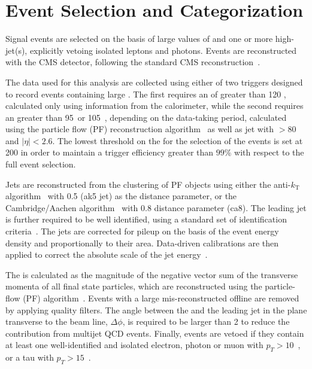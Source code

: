 \section{Event Selection and Categorization}\label{sec:selection}

Signal events are selected on the basis of large values of \ETm and one or more high-\pt jet(s), 
explicitly vetoing isolated leptons and photons. Events are
reconstructed with the CMS detector, following the standard CMS reconstruction~\cite{CMSdetector}. 

The data used for this analysis are collected using either of two triggers designed to record events containing large \ETm. The first requires an \ETm of greater than 120 \gev, calculated only using information from the calorimeter, 
while the second requires an \ETm greater than 95~\gev or 105~\gev, depending on the data-taking period, calculated using  
the particle flow (PF) reconstruction algorithm~\cite{CMS-PAS-PFT-09-001} as well as jet with \pt$>80$ \gev and $|\eta|<2.6$. 
The lowest threshold on the \ETm for the selection of the events is set at 200 \gev in order to maintain a trigger efficiency greater than 
$99$\% with respect to the full event selection. 

Jets are reconstructed from the clustering of PF objects using either the 
anti-$k_{\textrm{T}}$ algorithm~\cite{Cacciari:2008gp} with 0.5 (ak5 jet) as the distance parameter,  
or the Cambridge/Aachen algorithm~\cite{cajets} with 0.8 distance
parameter (ca8). The leading jet is further required to be well
identified, using a standard set of identification criteria~\cite{jec}. The jets are corrected for pileup on the basis of the event energy density and 
proportionally to their area. Data-driven calibrations are then applied to correct the absolute scale of the jet energy~\cite{jec}.

The \ETm is calculated as the magnitude of the negative 
vector sum of the transverse momenta of all final state particles, which are reconstructed 
using the particle-flow (PF) algorithm~\cite{CMS-PAS-PFT-09-001}.
Events with a large mis-reconstructed offline \ETm are removed by applying quality filters. 
The angle between the \ETm and the leading jet in the plane transverse to the beam line, $\Delta\phi$, is required to be larger than 2 to reduce the contribution from multijet QCD events. 
Finally, events are vetoed if they contain at least one well-identified and isolated electron, photon or muon with $p_T>10$~\gev, or a tau with $p_T>15$~\gev.

